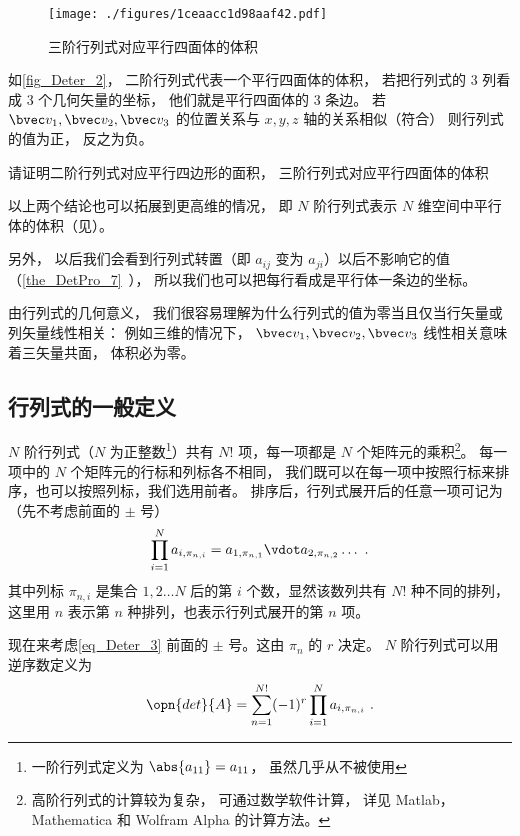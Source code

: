 \begin{figure}[ht]
\centering
\texttt{[image: ./figures/1ceaacc1d98aaf42.pdf]}
\caption{三阶行列式对应平行四面体的体积} \label{fig_Deter_2}
\end{figure}
如\autoref{fig_Deter_2}， 二阶行列式代表一个平行四面体的体积， 若把行列式的 3 列看成 3 个几何矢量的坐标， 他们就是平行四面体的 3 条边。 若 $\bvec v_1, \bvec v_2, \bvec v_3$ 的位置关系与 $x, y, z$ 轴的关系相似（符合） 则行列式的值为正， 反之为负。

\begin{exercise}{}
请证明二阶行列式对应平行四边形的面积， 三阶行列式对应平行四面体的体积
\end{exercise}

以上两个结论也可以拓展到更高维的情况， 即 $N$ 阶行列式表示 $N$ 维空间中平行体的体积（见）。

另外， 以后我们会看到行列式转置（即 $a_{ij}$ 变为 $a_{ji}$）以后不影响它的值（\autoref{the_DetPro_7}~）， 所以我们也可以把每行看成是平行体一条边的坐标。

由行列式的几何意义， 我们很容易理解为什么行列式的值为零当且仅当行矢量或列矢量线性相关： 例如三维的情况下， $\bvec v_1, \bvec v_2, \bvec v_3$ 线性相关意味着三矢量共面， 体积必为零。

\subsection{行列式的一般定义}


$N$ 阶行列式（$N$ 为正整数\footnote{一阶行列式定义为 $\abs{a_{11}}=a_{11}$， 虽然几乎从不被使用}）共有 $N!$ 项，每一项都是 $N$ 个矩阵元的乘积\footnote{高阶行列式的计算较为复杂， 可通过数学软件计算， 详见 Matlab，Mathematica 和 Wolfram Alpha 的计算方法。%
}。 每一项中的 $N$ 个矩阵元的行标和列标各不相同， 我们既可以在每一项中按照行标来排序，也可以按照列标，我们选用前者。 排序后，行列式展开后的任意一项可记为（先不考虑前面的 $\pm$ 号）
\begin{equation}\label{eq_Deter_3}
\prod_{i=1}^N a_{i,\pi_{n,i}} = 
a_{1,\pi_{n,1}} \vdot a_{2,\pi_{n,2}} \dots~.
\end{equation}
其中列标 $\pi_{n,i}$ 是集合 ${1,2 \dots N}$ 后的第 $i$ 个数，显然该数列共有 $N!$ 种不同的排列，这里用 $n$ 表示第 $n$ 种排列，也表示行列式展开的第 $n$ 项。

现在来考虑\autoref{eq_Deter_3} 前面的 $\pm$ 号。这由 $\pi_n$ 的 $r$ 决定。 $N$ 阶行列式可以用逆序数定义为
\begin{equation}\label{eq_Deter_4}
\opn{det}{A} = \sum_{n=1}^{N!} (-1)^{r} \prod_{i=1}^N a_{i,\pi_{n,i}}~.
\end{equation}

